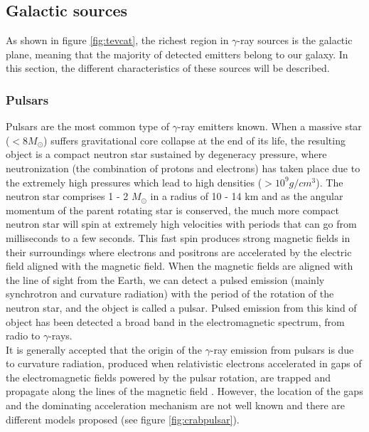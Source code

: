 \documentclass[main.tex]{subfiles}
\begin{document}
\subsection{Galactic sources}

As shown in figure \ref{fig:tevcat}, the richest region in $\gamma$-ray sources is the galactic plane, meaning that the majority of detected emitters belong to our galaxy. In this section, the different characteristics of these sources will be described. 

\subsubsection{Pulsars} \label{sec:pulsars}

Pulsars are the most common type of $\gamma$-ray emitters known. When a massive star ($< 8 M_{\odot}$) suffers gravitational core collapse at the end of its life, the resulting object is a compact neutron star sustained by degeneracy pressure, where neutronization (the combination of protons and electrons) has taken place due to the extremely high pressures which lead to high densities ($> 10^{9}g/cm^{3}$). The neutron star comprises 1 - 2 $M_{\odot}$ in a radius of 10 - 14 km and as the angular momentum of the parent rotating star is conserved, the much more compact neutron star will spin at extremely high velocities  with periods  that can go from milliseconds to a few seconds. This fast spin produces strong magnetic fields in their surroundings where electrons and positrons are accelerated by the electric field aligned with the magnetic field. When the magnetic fields are aligned with the line of sight from the Earth, we can detect a pulsed emission (mainly synchrotron and curvature radiation) with the period of the rotation of the neutron star, and the object is called a pulsar. Pulsed emission from this kind of object has been detected a broad band in the electromagnetic spectrum, from radio to $\gamma$-rays.\\ 
It is generally accepted that the origin of the $\gamma$-ray emission from pulsars is due to curvature radiation, produced when relativistic electrons accelerated in gaps of the electromagnetic fields powered by the pulsar rotation, are trapped and propagate along the lines of the magnetic field \cite{2008crabmagic}. However, the location of the gaps and the dominating acceleration mechanism are not well known and there are different models proposed (see figure \ref{fig:crabpulsar}).\\ 
\end{document}
